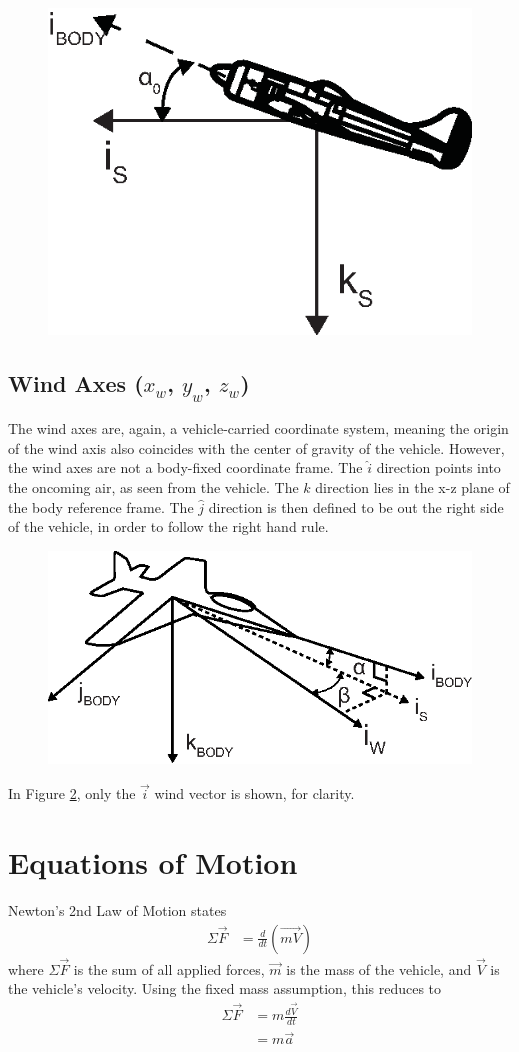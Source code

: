 \begin{figure}[H]
  \centering
  \includegraphics[width=.4\linewidth]{figures/pitchStability.eps}
  \label{stabilityAxesFig}
\end{figure}
\subsection*{Wind Axes ($x_w$, $y_w$, $z_w$)}
The wind axes are, again, a vehicle-carried coordinate system, meaning the origin of the wind axis also coincides with the center of gravity of the vehicle. However, the wind axes are not a body-fixed coordinate frame. The $\hat{i}$ direction points into the oncoming air, as seen from the vehicle. The $\hat{k}$ direction lies in the x-z plane of the body reference frame. The $\hat{j}$ direction is then defined to be out the right side of the vehicle, in order to follow the right hand rule. 

\begin{figure}[H]
  \centering
  \includegraphics[width=.6\linewidth]{figures/windAxes.eps}
  \label{windAxesFig}
\end{figure}
In Figure \ref{windAxesFig}, only the $\vec{i}$ wind vector is shown, for clarity. 

\section{Equations of Motion}
\label{sys-desc}
Newton's 2nd Law of Motion states
\begin{align}
\Sigma\vec{F} &= \frac{d}{dt}(\vec{mV})
\end{align}
\noindent
where $\Sigma\vec{F}$ is the sum of all applied forces, $\vec{m}$ is the mass of the vehicle, and $\vec{V}$ is the vehicle's velocity. Using the fixed mass assumption, this reduces to 
\begin{align}
\Sigma\vec{F} &= m\frac{d\vec{V}}{dt}\\
&= m\vec{a}
\end{align}

